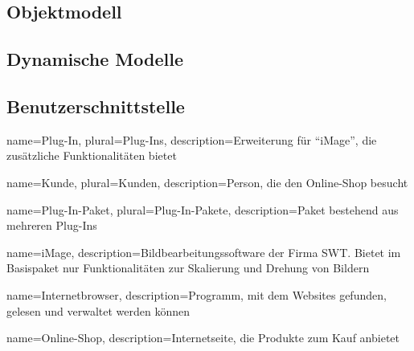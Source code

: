 \documentclass[titlepage=true, parskip=full]{scrartcl}
\begin{document}
\begin{center}
\end{center}

\subsection{Objektmodell}

\subsection{Dynamische Modelle}

\subsection{Benutzerschnittstelle}




%
%
%
%
{
	name=Plug-In,
	plural=Plug-Ins,
	description={Erweiterung für \enquote{\gls{iMage}}, die zusätzliche Funktionalitäten bietet}
}

{
	name=Kunde,
	plural=Kunden,
	description={Person, die den \gls{Online-Shop} besucht}
}

{
	name=Plug-In-Paket,
	plural=Plug-In-Pakete,
	description={Paket bestehend aus mehreren \glspl{Plug-In}}
}

{
	name={iMage},
	description={Bildbearbeitungssoftware der Firma SWT. Bietet im Basispaket nur Funktionalitäten zur Skalierung und Drehung von Bildern}
}

{
	name={Internetbrowser},
	description={Programm, mit dem Websites gefunden, gelesen und verwaltet werden können}
}

{
	name={Online-Shop},
	description={Internetseite, die Produkte zum Kauf anbietet}
}
\end{document}
